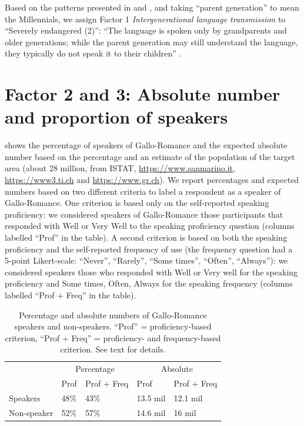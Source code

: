 \documentclass[a4paper,11pt]{article}
\begin{document}
Based on the patterns presented in  and , and taking ``parent generation'' to mean the Millennials, we assign Factor 1 \textit{Intergenerational language transmission} to ``Severely endangered (2)'': ``The language is spoken only by grandparents and older generations; while the parent generation may still understand the language, they typically do not speak it to their children'' \citep[8]{unesco2003}.

\section{Factor 2 and 3: Absolute number and proportion of speakers}

 shows the percentage of speakers of Gallo-Romance and the expected absolute number based on the percentage and an estimate of the population of the target area (about 28 million, from ISTAT, \url{https://www.sanmarino.it}, \url{https://www3.ti.ch} and \url{https://www.gr.ch}). We report percentages and expected numbers based on two different criteria to label a respondent as a speaker of Gallo-Romance. One criterion is based only on the self-reported speaking proficiency: we considered speakers of Gallo-Romance those participants that responded with Well or Very Well to the speaking proficiency question (columns labelled ``Prof'' in the table). A second criterion is based on both the speaking proficiency and the self-reported frequency of use (the frequency question had a 5-point Likert-scale: ``Never'', ``Rarely'', ``Some times'', ``Often'', ``Always''): we considered speakers those who responded with Well or Very well for the speaking proficiency and Some times, Often, Always for the speaking frequency (columns labelled ``Prof + Freq'' in the table).

\begin{table}
\caption{Percentage and absolute numbers of Gallo-Romance speakers and non-speakers. ``Prof'' = proficiency-based criterion, ``Prof + Freq'' = proficiency- and frequency-based criterion. See text for details.}
\label{tab:numbers}
\centering
\begin{tabular}{@{}lllll@{}}
\toprule
            & \multicolumn{2}{c}{Percentage} & \multicolumn{2}{c}{Absolute} \\ 
            & Prof       & Prof + Freq       & Prof        & Prof + Freq    \\ \midrule
Speakers    & 48\%       & 43\%              & 13.5 mil    & 12.1 mil       \\
Non-speaker & 52\%       & 57\%              & 14.6 mil    & 16 mil       \\ \bottomrule
\end{tabular}
\end{table}
\end{document}
